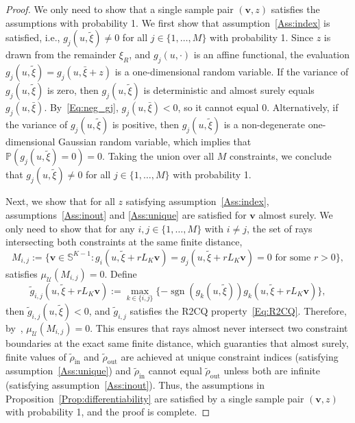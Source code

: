 \documentclass[%
onefignum,onetabnum]{siamonline250211}
\newcommand{\sgn}{\operatorname{sgn}}
\newcommand{\bbP}{\mathbb P}
\newcommand{\bbS}{\mathbb S}
\newcommand{\cU}{\mathcal U} \newcommand{\cV}{\mathcal V}
\begin{document}
\begin{proof}
    We only need to show that a single sample pair $(\boldsymbol{v},z)$ satisfies the assumptions with probability 1. We first show that assumption~\ref{Ass:index} is satisfied, i.e., $g_j(u,\tilde{\xi})\neq 0$ for all $j \in \{1,\dots,M\}$ with probability 1. Since $z$ is drawn from the remainder $\xi_R$, and $g_j(u,\cdot)$ is an affine functional, the evaluation $g_j(u,\tilde{\xi})=g_j(u,\bar{\xi}+z)$ is a one-dimensional random variable. If the variance of $g_j(u,\tilde{\xi})$ is zero, then $g_j(u,\tilde{\xi})$ is deterministic and almost surely equals $g_j(u,\bar{\xi})$. By~\eqref{Eq:neg_gj}, $g_j(u,\bar{\xi})<0$, so it cannot equal $0$. Alternatively, if the variance of $g_j(u,\tilde{\xi})$ is positive, then $g_j(u,\tilde{\xi})$ is a non-degenerate one-dimensional Gaussian random variable, which implies that $\bbP(g_j(u,\tilde{\xi})=0)=0$. Taking the union over all $M$ constraints, we conclude that $g_j(u,\tilde{\xi}) \neq 0$ for all $j\in\{1,\dots,M\}$ with probability 1.

    Next, we show that for all $z$ satisfying assumption~\ref{Ass:index}, assumptions~\ref{Ass:inout} and \ref{Ass:unique} are satisfied for $\boldsymbol{v}$ almost surely. We only need to show that for any $i,j\in\{1,\dots,M\}$ with $i\neq j$, the set of rays intersecting both constraints at the same finite distance,
    \begin{equation*}
        M_{i,j}:=\{\boldsymbol{v}\in\bbS^{K-1}:g_i(u,\tilde{\xi}+rL_K\boldsymbol{v})=g_j(u,\tilde{\xi}+rL_K\boldsymbol{v})=0\text{ for some }r>0\},
    \end{equation*}
    satisfies $\mu_{\cU}(M_{i,j})=0$. Define
    \begin{equation*}
        \tilde{g}_{i,j}(u,\tilde{\xi}+rL_K\boldsymbol{v}):=\max_{k\in\{i,j\}}{\{-\sgn{(g_k(u,\tilde{\xi}))}g_k(u,\tilde{\xi}+rL_K\boldsymbol{v})\}},
    \end{equation*}
    then $\tilde{g}_{i,j}(u,\tilde{\xi})<0$, and $\tilde{g}_{i,j}$ satisfies the R2CQ property~\eqref{Eq:R2CQ}. Therefore, by~\cite[Lem.~4.3]{AcHe-SIAM17}, $\mu_{\cU}(M_{i,j})=0$. This ensures that rays almost never intersect two constraint boundaries at the exact same finite distance, which guaranties that almost surely, finite values of $\tilde{\rho}_{\mathrm{in}}$ and $\tilde{\rho}_{\mathrm{out}}$ are achieved at unique constraint indices (satisfying assumption~\ref{Ass:unique}) and $\tilde{\rho}_{\mathrm{in}}$ cannot equal $\tilde{\rho}_{\mathrm{out}}$ unless both are infinite (satisfying assumption~\ref{Ass:inout}). Thus, the assumptions in Proposition~\ref{Prop:differentiability} are satisfied by a single sample pair $(\boldsymbol{v},z)$ with probability 1, and the proof is complete.
\end{proof}
\end{document}

